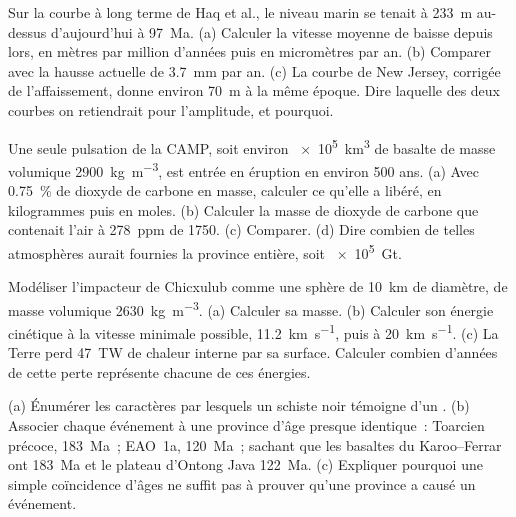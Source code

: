 \begin{exercise}[$\star\star$]\label{exo:b2:phanerozoic-earth:5}
Sur la courbe à long terme de Haq et al., le niveau marin se tenait à \qty{233}{m} au-dessus
d'aujourd'hui à \qty{97}{Ma}. (a) Calculer la vitesse moyenne de baisse depuis lors, en mètres par
million d'années puis en micromètres par an. (b) Comparer avec la hausse actuelle de \qty{3.7}{mm}
par an. (c) La courbe de New Jersey, corrigée de l'affaissement, donne environ \qty{70}{m}
à la même époque. Dire laquelle des deux courbes on retiendrait pour l'amplitude, et pourquoi.
\end{exercise}

\begin{exercise}[$\star\star$]\label{exo:b2:phanerozoic-earth:6}
Une seule pulsation de la CAMP, soit environ \qty{e5}{km^3} de basalte de masse volumique
\qty{2900}{kg.m^{-3}}, est entrée en éruption en environ 500 ans. (a) Avec \qty{0.75}{\percent} de
dioxyde de carbone en masse, calculer ce qu'elle a libéré, en kilogrammes puis en moles. (b) Calculer
la masse de dioxyde de carbone que contenait l'air à \qty{278}{ppm} de 1750. (c) Comparer.
(d) Dire combien de telles atmosphères aurait fournies la province entière, soit \qty{e5}{Gt}.
\end{exercise}

\begin{exercise}[$\star\star$]\label{exo:b2:phanerozoic-earth:7}
Modéliser l'impacteur de Chicxulub comme une sphère de \qty{10}{km} de diamètre, de masse volumique
\qty{2630}{kg.m^{-3}}. (a) Calculer sa masse. (b) Calculer son énergie cinétique à la vitesse minimale
possible, \qty{11.2}{km.s^{-1}}, puis à \qty{20}{km.s^{-1}}. (c) La Terre perd \qty{47}{TW} de chaleur
interne par sa surface. Calculer combien d'années de cette perte représente chacune de ces énergies.
\end{exercise}

\begin{exercise}[$\star\star$]\label{exo:b2:phanerozoic-earth:8}
(a) Énumérer les caractères par lesquels un schiste noir témoigne d'un . (b) Associer
chaque événement à une province d'âge presque identique~: Toarcien précoce, \qty{183}{Ma}~; EAO~1a, \qty{120}{Ma}~;
sachant que les basaltes du Karoo--Ferrar ont \qty{183}{Ma} et le plateau d'Ontong Java \qty{122}{Ma}. (c)
Expliquer pourquoi une simple coïncidence d'âges ne suffit pas à prouver qu'une province a causé un événement.
\end{exercise}

